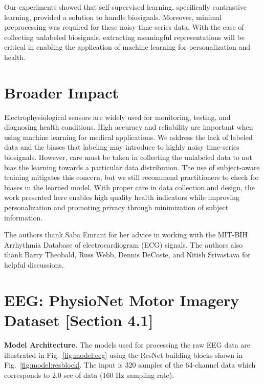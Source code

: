 \documentclass{article}
\renewcommand{\paragraph}[1]{\textbf{#1}\hspace{1em}}
\begin{document}
Our experiments showed that self-supervised learning, specifically contrastive
learning, provided a solution to handle biosignals. Moreover, minimal
preprocessing was required for these noisy time-series data. With the ease of
collecting unlabeled biosignals, extracting meaningful representations will be
critical in enabling the application of machine learning for personalization and
health.
 

\section*{Broader Impact}

Electrophysiological sensors are widely used for monitoring, testing, and
diagnosing health conditions. High accuracy and reliability are important when
using machine learning for medical applications. We address the lack of labeled
data and the biases that labeling may introduce to highly noisy time-series
biosignals. However, care must be taken in collecting the unlabeled data to not
bias the learning towards a particular data distribution. The use of
subject-aware training mitigates this concern, but we still recommend
practitioners to check for biases in the learned model. With proper care in data
collection and design, the work presented here enables high quality health
indicators while improving personalization and promoting privacy through
minimization of subject information.
 

\begin{ack}
  The authors thank Saba Emrani for her advice in working with the MIT-BIH
  Arrhythmia Database of electrocardiogram (ECG) signals. The authors also thank
  Barry Theobald, Russ Webb, Dennis DeCoste, and Nitish Srivastava for helpful
  discussions.
\end{ack} 


\clearpage

\appendix
{}
\section{EEG: PhysioNet Motor Imagery Dataset [Section 4.1]}

\paragraph{Model Architecture.} The models used for processing the raw EEG data
are illustrated in Fig.~\ref{fig:model:eeg} using the ResNet building blocks
shown in Fig.~\ref{fig:model:resblock}. The input is 320 samples of the
64-channel data which corresponds to 2.0 sec of data (160 Hz sampling rate).
\end{document}
